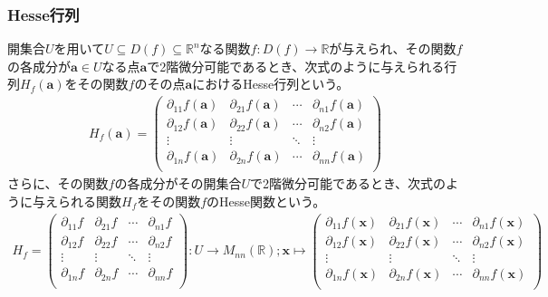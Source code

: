 \documentclass[dvipdfmx]{jsarticle}
\begin{document}
\subsubsection{Hesse行列}%
\begin{dfn}
開集合$U$を用いて$U \subseteq D(f) \subseteq \mathbb{R}^{n}$なる関数$f:D(f) \rightarrow \mathbb{R}$が与えられ、その関数$f$の各成分が$\mathbf{a} \in U$なる点$\mathbf{a}$で2階微分可能であるとき、次式のように与えられる行列$H_{f}\left( \mathbf{a} \right)$をその関数$f$のその点$\mathbf{a}$におけるHesse行列という。
\begin{align*}
H_{f}\left( \mathbf{a} \right) = \begin{pmatrix}
\partial_{11}f\left( \mathbf{a} \right) & \partial_{21}f\left( \mathbf{a} \right) & \cdots & \partial_{n1}f\left( \mathbf{a} \right) \\
\partial_{12}f\left( \mathbf{a} \right) & \partial_{22}f\left( \mathbf{a} \right) & \cdots & \partial_{n2}f\left( \mathbf{a} \right) \\
 \vdots & \vdots & \ddots & \vdots \\
\partial_{1n}f\left( \mathbf{a} \right) & \partial_{2n}f\left( \mathbf{a} \right) & \cdots & \partial_{nn}f\left( \mathbf{a} \right) \\
\end{pmatrix}
\end{align*}
さらに、その関数$f$の各成分がその開集合$U$で2階微分可能であるとき、次式のように与えられる関数$H_{f}$をその関数$f$のHesse関数という。
\begin{align*}
H_{f} = \begin{pmatrix}
\partial_{11}f & \partial_{21}f & \cdots & \partial_{n1}f \\
\partial_{12}f & \partial_{22}f & \cdots & \partial_{n2}f \\
 \vdots & \vdots & \ddots & \vdots \\
\partial_{1n}f & \partial_{2n}f & \cdots & \partial_{nn}f \\
\end{pmatrix}:U \rightarrow M_{nn}\left( \mathbb{R} \right);\mathbf{x} \mapsto \begin{pmatrix}
\partial_{11}f\left( \mathbf{x} \right) & \partial_{21}f\left( \mathbf{x} \right) & \cdots & \partial_{n1}f\left( \mathbf{x} \right) \\
\partial_{12}f\left( \mathbf{x} \right) & \partial_{22}f\left( \mathbf{x} \right) & \cdots & \partial_{n2}f\left( \mathbf{x} \right) \\
 \vdots & \vdots & \ddots & \vdots \\
\partial_{1n}f\left( \mathbf{x} \right) & \partial_{2n}f\left( \mathbf{x} \right) & \cdots & \partial_{nn}f\left( \mathbf{x} \right) \\
\end{pmatrix}
\end{align*}
\end{dfn}
\end{document}
